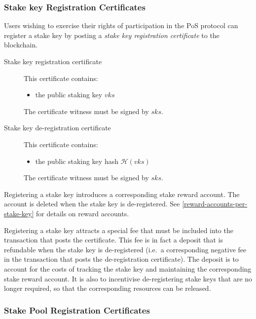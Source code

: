 \documentclass[11pt,a4paper]{article}
\begin{document}
\subsubsection{Stake key Registration Certificates}
\label{stake-key-registration-certificates}

Users wishing to exercise their rights of participation in the PoS
protocol can register a stake key by posting a \emph{stake key
registration certificate} to the blockchain.

\begin{description}
\item[Stake key registration certificate]
This certificate contains:

\begin{itemize}
\item
  the public staking key \(vks\)
\end{itemize}

The certificate witness must be signed by \(sks\).
\item[Stake key de-registration certificate]
This certificate contains:

\begin{itemize}
\item
  the public staking key hash \(\mathcal{H}(vks)\)
\end{itemize}

The certificate witness must be signed by \(sks\).
\end{description}

Registering a stake key introduces a corresponding stake reward account.
The account is deleted when the stake key is de-registered. See
\cref{reward-accounts-per-stake-key} for details on reward accounts.

Registering a stake key attracts a special fee that must be included
into the transaction that posts the certificate. This fee is in fact a
deposit that is refundable when the stake key is de-registered (i.e.~a
corresponding negative fee in the transaction that posts the
de-registration certificate). The deposit is to account for the costs of
tracking the stake key and maintaining the corresponding stake reward
account. It is also to incentivise de-registering stake keys that are no
longer required, so that the corresponding resources can be released.

\subsubsection{Stake Pool Registration Certificates}
\label{stake-pool-registration-certificates}
\end{document}
